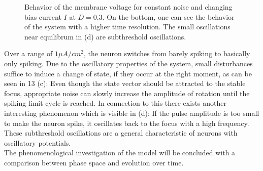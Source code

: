 \documentclass[12pt,a4paper]{article}
\begin{document}
\begin{figure}[H]
	\caption{Behavior of the membrane voltage for constant noise and changing bias current $I$ at $D=0.3$. On the bottom, one can see the behavior of the system with a higher time resolution. The small oscillations near equilibrum in (d) are subthreshold oscillations.}
	\label{ahnoise} 
\end{figure}
Over a range of $1\mu A/cm^2$, the neuron switches from barely spiking to basically only spiking. Due to the oscillatory properties of the system, small disturbances suffice to induce a change of state, if they occur at the right moment, as can be seen in 13 (c): Even though the state vector should be attracted to the stable focus, appropriate noise can slowly increase the amplitude of rotation until the spiking limit cycle is reached. In connection to this there exists another interesting phenomenon which is visible in (d): If the pulse amplitude is too small to make the neuron spike, it oscillates back to the focus with a high frequency. These subthreshold oscillations are a general characteristic of neurons with oscillatory potentials.\\
The phenomenological investigation of the model will be concluded with a comparison between phase space and evolution over time.
\end{document}
